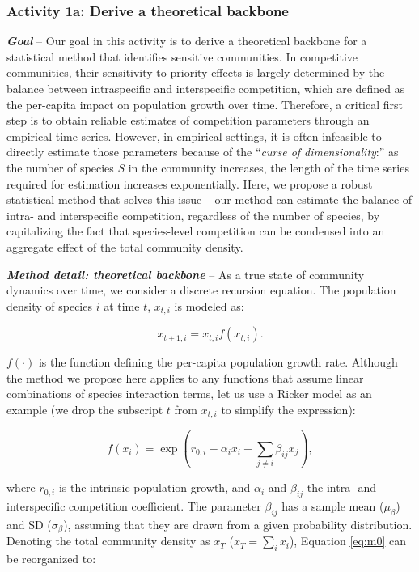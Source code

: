 \documentclass[12pt, class=article, crop=false]{standalone}
\begin{document}
\subsubsection*{Activity 1a: Derive a theoretical backbone}

\textbf{\textit{Goal}} -- 
Our goal in this activity is to derive a theoretical backbone for a statistical method that identifies sensitive communities.
In competitive communities, their sensitivity to priority effects is largely determined by the balance between intraspecific and interspecific competition, which are defined as the per-capita impact on population growth over time.
Therefore, a critical first step is to obtain reliable estimates of competition parameters through an empirical time series.
However, in empirical settings, it is often infeasible to directly estimate those parameters because of the ``\textit{curse of dimensionality}:'' as the number of species $S$ in the community increases, the length of the time series required for estimation increases exponentially.
Here, we propose a robust statistical method that solves this issue -- our method can estimate the balance of intra- and interspecific competition, regardless of the number of species, by capitalizing the fact that species-level competition can be condensed into an aggregate effect of the total community density.

\textbf{\textit{Method detail: theoretical backbone}} -- 
As a true state of community dynamics over time, we consider a discrete recursion equation. The population density of species $i$ at time $t$, $x_{t,i}$ is modeled as:

\begin{equation}
\label{eq:m0}
x_{t + 1, i} = x_{t, i} f(x_{t, i}).
\end{equation}

$f(\cdot)$ is the function defining the per-capita population growth rate.
Although the method we propose here applies to any functions that assume linear combinations of species interaction terms, let us use a Ricker model as an example (we drop the subscript $t$ from $x_{t,i}$ to simplify the expression):

\begin{equation}
\label{eq:ricker}
f(x_{i}) = \exp(r_{0,i} - \alpha_i x_i - \sum_{j \ne i} \beta_{ij} x_{j}),
\end{equation}

where $r_{0,i}$ is the intrinsic population growth, and $\alpha_{i}$ and $\beta_{ij}$ the intra- and interspecific competition coefficient.
The parameter $\beta_{ij}$ has a sample mean ($\mu_{\beta}$) and SD ($\sigma_{\beta}$), assuming that they are drawn from a given probability distribution. 
Denoting the total community density as $x_T$ ($x_T = \sum_i x_i$), Equation \ref{eq:m0} can be reorganized to:
\end{document}
